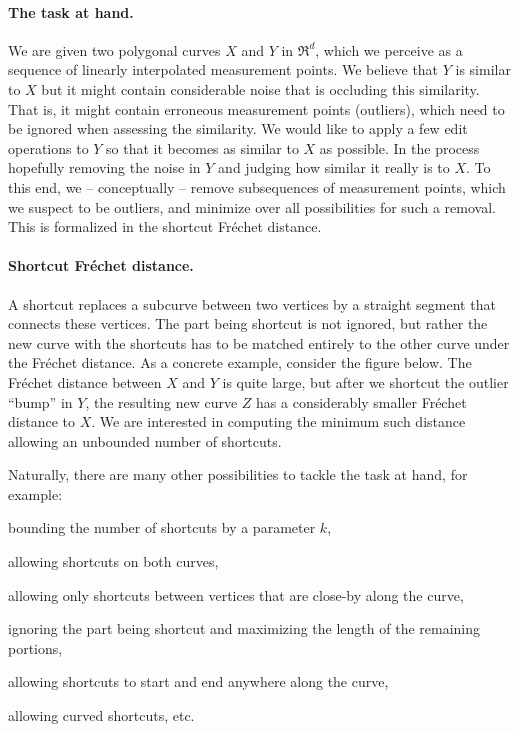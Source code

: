 \documentclass[12pt]{article}
\newcommand{\Frechet}{Fr\'{e}c{h}e{}t\xspace}\providecommand{\Arr}{\mathop{\mathrm{\EuScript{A}}}}
\newcommand{\SimplifyX}[1]{#1}
\newcommand{\cZ}{{Z}}
\newcommand{\cXBase}{X} \newcommand{\cYBase}{Y} \newcommand{\crvCBase}{{\pi}}
\newcommand{\cX}{\SimplifyX{\cXBase}}
\newcommand{\cY}{\SimplifyX{\cYBase}}
\numberwithin{figure}{section}
\numberwithin{equation}{section}
\begin{document}
\paragraph{The task at hand.} We are given two polygonal curves $\cX$
and $\cY$ in $\Re^d$, which we perceive as a sequence of linearly
interpolated measurement points. We believe that $\cY$ is similar to
$\cX$ but it might contain considerable noise that is occluding this
similarity. That is, it might contain erroneous measurement points
(outliers), which need to be ignored when assessing the similarity.
We would like to apply a few edit operations to $\cY$ so that it
becomes as similar to $\cX$ as possible. In the process hopefully
removing the noise in $\cY$ and judging how similar it really is to
$\cX$.  To this end, we -- conceptually -- remove subsequences of
measurement points, which we suspect to be outliers, and minimize over
all possibilities for such a removal. This is formalized in the
shortcut \Frechet distance.


\paragraph{Shortcut \Frechet distance.}
A shortcut replaces a subcurve between two vertices by a straight
segment that connects these vertices.  The part being shortcut is not
ignored, but rather the new curve with the shortcuts has to be matched
entirely to the other curve under the \Frechet distance.  As a
concrete example, consider the figure below.  The \Frechet distance
between $\cX$ and $\cY$ is quite large, but after we shortcut the
outlier ``bump'' in $\cY$, the resulting new curve $\cZ$ has a
considerably smaller \Frechet distance to $\cX$.  We are interested in
computing the minimum such distance allowing an unbounded number of
shortcuts.

Naturally, there are many other possibilities to tackle the task at
hand, for example:
\begin{compactenum}[(i)]
    \item bounding the number of shortcuts by a parameter $k$,
    \item allowing shortcuts on both curves,
    \item allowing only shortcuts between vertices that are close-by
    along the curve,
    \item ignoring the part being shortcut and maximizing the length
    of the remaining portions,
    \item allowing shortcuts to start and end anywhere along the
    curve,
    \item allowing curved shortcuts, etc.
\end{compactenum}
\end{document}

